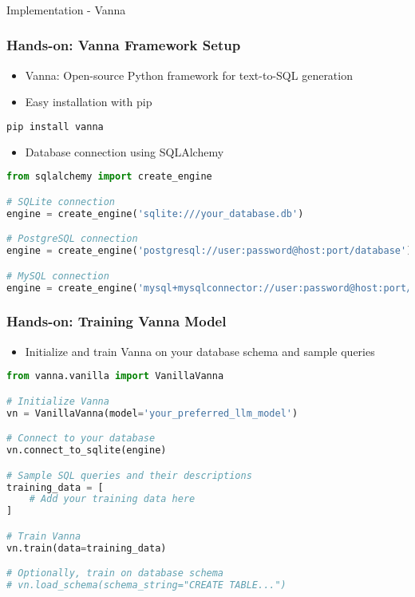 \begin{frame}[fragile]\frametitle{}
\begin{center}
{\Large Implementation - Vanna}
\end{center}
\end{frame}

\begin{frame}[fragile]\frametitle{Hands-on: Vanna Framework Setup}
      \begin{itemize}
        \item Vanna: Open-source Python framework for text-to-SQL generation
        \item Easy installation with pip
      \end{itemize}
      
\begin{lstlisting}[language=bash]
pip install vanna
\end{lstlisting}

      \begin{itemize}
        \item Database connection using SQLAlchemy
      \end{itemize}
      
\begin{lstlisting}[language=python]
from sqlalchemy import create_engine

# SQLite connection
engine = create_engine('sqlite:///your_database.db')

# PostgreSQL connection
engine = create_engine('postgresql://user:password@host:port/database')

# MySQL connection
engine = create_engine('mysql+mysqlconnector://user:password@host:port/database')
\end{lstlisting}
\end{frame}

\begin{frame}[fragile]\frametitle{Hands-on: Training Vanna Model}
      \begin{itemize}
        \item Initialize and train Vanna on your database schema and sample queries
      \end{itemize}
      
\begin{lstlisting}[language=python]
from vanna.vanilla import VanillaVanna

# Initialize Vanna
vn = VanillaVanna(model='your_preferred_llm_model')

# Connect to your database
vn.connect_to_sqlite(engine)

# Sample SQL queries and their descriptions
training_data = [
    # Add your training data here
]

# Train Vanna
vn.train(data=training_data)

# Optionally, train on database schema
# vn.load_schema(schema_string="CREATE TABLE...")
\end{lstlisting}
\end{frame}

